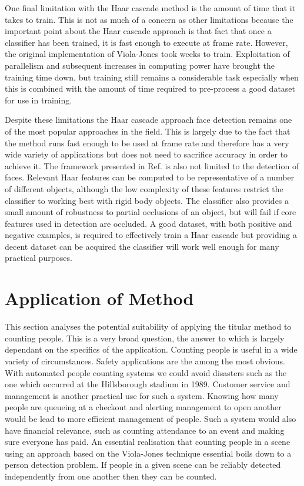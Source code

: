 \documentclass[conference]{IEEEtran}
\begin{document}
One final limitation with the Haar cascade method is the amount of time that it takes to train. This is not as much of a concern as other limitations because the important point about the Haar cascade approach is that fact that once a classifier has been trained, it is fast enough to execute at frame rate. However, the original implementation of Viola-Jones took weeks to train. Exploitation of parallelism \cite{viola2004robust} and subsequent increases in computing power have brought the training time down, but training still remains a considerable task especially when this is combined with the amount of time required to pre-process a good dataset for use in training.

Despite these limitations the Haar cascade approach face detection remains one of the most popular approaches in the field. This is largely due to the fact that the method runs fast enough to be used at frame rate and therefore has a very wide variety of applications but does not need to sacrifice accuracy in order to achieve it. The framework presented in Ref. \cite{viola2004robust} is also not limited to the detection of faces. Relevant Haar features can be computed to be representative of a number of different objects, although the low complexity of these features restrict the classifier to working best with rigid body objects. The classifier also provides a small amount of robustness to partial occlusions of an object, but will fail if core features used in detection are occluded. A good dataset, with both positive and negative examples, is required to effectively train a Haar cascade but providing  a decent dataset can be acquired the classifier will work well enough for many practical purposes.

\section{Application of Method} \label{sec:application-of-method}
This section analyses the potential suitability of applying the titular method to counting people. This is a very broad question, the answer to which is largely dependant on the specifics of the application. Counting people is useful in a wide variety of circumstances. Safety applications are the among the most obvious. With automated people counting systems we could avoid disasters such as the one which occurred at the Hillsborough stadium in 1989. Customer service and management is another practical use for such a system. Knowing how many people are queueing at a checkout and alerting management to open another would be lead to more efficient management of people. Such a system would also have financial relevance, such as counting attendance to an event and making sure everyone has paid. An essential realisation that counting people in a scene using an approach based on the Viola-Jones technique essential boils down to a person detection problem. If people in a given scene can be reliably detected independently from one another then they can be counted.
\end{document}
